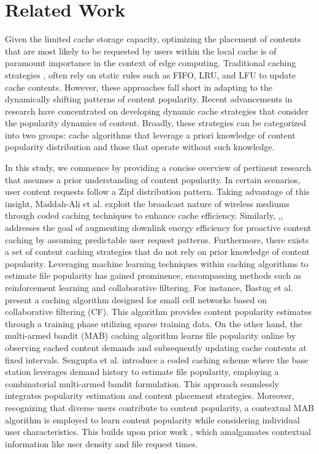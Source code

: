 \section{Related Work}
Given the limited cache storage capacity, optimizing the placement of contents that are most likely to be requested by users within the local cache is of paramount importance in the context of edge computing. Traditional caching strategies \cite{chen2013shortest}, \cite{chen2013shortest} often rely on static rules such as FIFO, LRU, and LFU to update cache contents. However, these approaches fall short in adapting to the dynamically shifting patterns of content popularity. Recent advancements in research have concentrated on developing dynamic cache strategies that consider the popularity dynamics of content. Broadly, these strategies can be categorized into two groups: cache algorithms that leverage a priori knowledge of content popularity distribution and those that operate without such knowledge.

In this study, we commence by providing a concise overview of pertinent research that assumes a prior understanding of content popularity. In certain scenarios, user content requests follow a Zipf distribution pattern. Taking advantage of this insight, Maddah-Ali et al. \cite{maddah2014fundamental} exploit the broadcast nature of wireless mediums through coded caching techniques to enhance cache efficiency. Similarly, \cite{gungor2015proactive},\cite{chen2018proactive},\cite{wang2022energy} addresses the goal of augmenting downlink energy efficiency for proactive content caching by assuming predictable user request patterns. Furthermore, there exists a set of content caching strategies that do not rely on prior knowledge of content popularity. Leveraging machine learning techniques within caching algorithms to estimate file popularity has gained prominence, encompassing methods such as reinforcement learning and collaborative filtering. For instance, Bastug et al. \cite{bastug2014living} present a caching algorithm designed for small cell networks based on collaborative filtering (CF). This algorithm provides content popularity estimates through a training phase utilizing sparse training data. On the other hand, the multi-armed bandit (MAB) caching algorithm learns file popularity online by observing cached content demands and subsequently updating cache contents at fixed intervals. Sengupta et al. \cite{sengupta2014learning} introduce a coded caching scheme where the base station leverages demand history to estimate file popularity, employing a combinatorial multi-armed bandit formulation. This approach seamlessly integrates popularity estimation and content placement strategies. Moreover, recognizing that diverse users contribute to content popularity, a contextual MAB algorithm is employed to learn content popularity while considering individual user characteristics. This builds upon prior work \cite{xu2020collaborative},\cite{maghsudi2020non} which amalgamates contextual information like user density and file request times.


